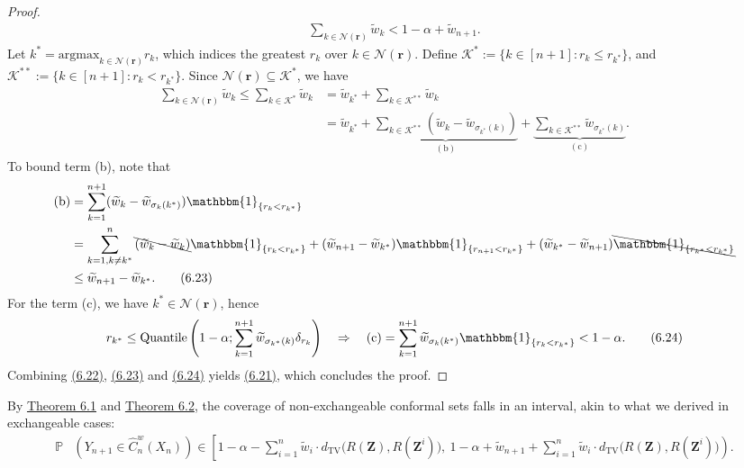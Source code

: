 \documentclass{article}
\numberwithin{equation}{section}
\begin{document}
\begin{proof}
\begin{align*}
	\sum_{k\in\mathcal{N}(\mathbf{r})}\widetilde{w}_{k} < 1-\alpha + \widetilde{w}_{n+1}.\tag{6.21}\label{6.21}
\end{align*}
Let $k^*=\mathrm{argmax}_{k\in\mathcal{N}(\mathbf{r})}r_k$, which indices the greatest $r_k$ over $k\in\mathcal{N}(\mathbf{r})$. Define $\mathcal{K^*}:=\{k\in[n+1]:r_k\leq r_{k^*}\}$, and $\mathcal{K}^{**} := \{k\in[n+1]:r_k < r_{k^*}\}$. Since $\mathcal{N}(\mathbf{r})\subseteq\mathcal{K^*}$, we have
\begin{align*}
	\sum_{k\in\mathcal{N}(\mathbf{r})} \widetilde{w}_k \leq \sum_{k\in\mathcal{K}^*} \widetilde{w}_k &= \widetilde{w}_{k^*} + \sum_{k\in\mathcal{K}^{**}} \widetilde{w}_k\\
	&= \widetilde{w}_{k^*} + \underbrace{\sum_{k\in\mathcal{K}^{**}} (\widetilde{w}_k - \widetilde{w}_{\sigma_{k^*}(k)})}_{\mathrm{(b)}} + \underbrace{\sum_{k\in\mathcal{K}^{**}} \widetilde{w}_{\sigma_{k^*}(k)}}_{\mathrm{(c)}}.\tag{6.22}\label{6.22}
\end{align*}
To bound term (b),  note that
\begin{align*}
	\mathrm{(b)} &= \sum_{k=1}^{n+1} (\widetilde{w}_k - \widetilde{w}_{\sigma_k(k^*)}) \mathbbm{1}_{\{r_k < r_{k^*}\}}\\
	&= \sum_{k=1,k\neq k^*}^{n} \bcancel{(\widetilde{w}_k - \widetilde{w}_k)} \mathbbm{1}_{\{r_k < r_{k^*}\}} + (\widetilde{w}_{n+1} - \widetilde{w}_{k^*})\mathbbm{1}_{\{r_{n+1} < r_{k^*}\}} + (\widetilde{w}_{k^*} - \widetilde{w}_{n+1})\bcancel{\mathbbm{1}_{\{r_{k^*} < r_{k^*}\}}}\\
	&\leq \widetilde{w}_{n+1} - \widetilde{w}_{k^*}.\tag{6.23}\label{6.23}
\end{align*}
For the term (c), we have $k^*\in\mathcal{N}(\mathbf{r})$, hence
\begin{align*}
	r_{k^*} \leq \mathrm{Quantile}\left(1-\alpha;\sum_{k=1}^{n+1}\widetilde{w}_{\sigma_{k^*}(k)}\delta_{r_k}\right)\quad\Rightarrow\quad \mathrm{(c)} = \sum_{k=1}^{n+1}\widetilde{w}_{\sigma_k(k^*)} \mathbbm{1}_{\{r_k < r_{k^*}\}} < 1-\alpha.\tag{6.24}\label{6.24}
\end{align*}
Combining \hyperref[6.22]{(6.22)}, \hyperref[6.23]{(6.23)} and \hyperref[6.24]{(6.24)} yields \hyperref[6.21]{(6.21)}, which concludes the proof.
\end{proof}

By \hyperref[Theorem 6.1]{Theorem 6.1} and \hyperref[Theorem 6.2]{Theorem 6.2}, the coverage of non-exchangeable conformal sets falls in an interval, akin to what we derived in exchangeable cases:
\begin{align*}
	\mathbb{P}&\left(Y_{n+1}\in \widehat{C}_n^w(X_n)\right) \in \left[
	1-\alpha - \sum_{i=1}^n\widetilde{w}_i\cdot d_\mathrm{TV}\bigl(R(\mathbf{Z}),R(\mathbf{Z}^i)\bigr),\ 
	1-\alpha + \widetilde{w}_{n+1} + \sum_{i=1}^n\widetilde{w}_i\cdot d_\mathrm{TV}\bigl(R(\mathbf{Z}),R(\mathbf{Z}^i)\bigr)
	\right).\tag{6.25}\label{6.25}
\end{align*}
\end{document}
